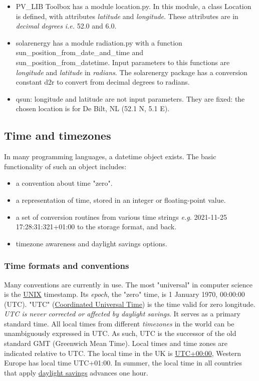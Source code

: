 \begin{itemize}
	\item \textsf{PV\_LIB Toolbox} has a  module \textsf{location.py}. In this module, a class \textsf{Location} is defined, with attributes  \emph{latitude} and \emph{longitude}. These attributes are in \emph{decimal degrees} \textit{i.e.} 52.0 and 6.0. 
	\item \textsf{solarenergy} has a module \textsf{radiation.py} with  a function \textsf{sun\_position\_from\_date\_and\_time} and \\ \textsf{sun\_position\_from\_datetime}. Input parameters to this functions are \emph{longitude} and \emph{latitude} in \emph{radians}. The \textsf{solarenergy} package has a conversion constant \textsf{d2r} to convert from decimal degrees to radians. 
	\item \textsf{qsun}: longitude and latitude are not input parameters. They are fixed: the chosen location is for De Bilt, NL (52.1 N, 5.1 E).
\end{itemize}

\subsection{Time and timezones}

In many programming languages, a \textsf{datetime} object exists. The basic functionality of such an object includes:
\begin{itemize}
	\item a convention about time "zero".
	\item a representation of time, stored in an integer or floating-point value.
	\item a set of conversion routines from various time strings \textit{e.g.} \textsf{2021-11-25 17:28:31:321+01:00} to the storage format, and back.
	\item timezone awareness and daylight savings options.
\end{itemize}

\subsubsection{Time formats and conventions}

Many conventions are currently in use. The most "universal" in computer science is the \href{https://en.wikipedia.org/wiki/Unix_time}{UNIX} timestamp. Its \emph{epoch}, the "zero" time, is 1 January 1970, 00:00:00 (UTC). "UTC" (\href{https://en.wikipedia.org/wiki/Coordinated_Universal_Time}{Coordinated Universal Time}) is the time valid for zero longitude. \textit{UTC is never corrected or affected by daylight savings}. It serves as a primary standard time. All local times from different \textit{timezones} in the world can be unambiguously expressed in UTC. As such, UTC is the successor of the old standard GMT (Greenwich Mean Time).  Local times and time zones are indicated relative to UTC. The local time in the UK is \href{https://en.wikipedia.org/wiki/UTC%2B00:00}{UTC+00:00}, Western Europe has local time UTC+01:00. In summer, the local time in all countries that apply  \href{https://en.wikipedia.org/wiki/Daylight_saving_time}{daylight savings} advances one hour.

